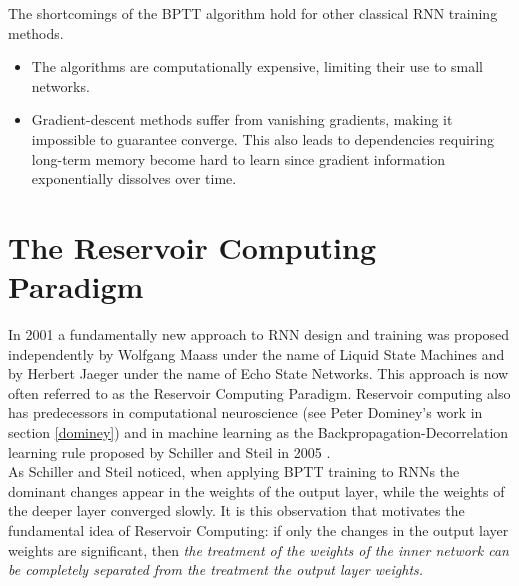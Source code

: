 \documentclass[12pt,oneside]{CUNY_CS_PhD}
\begin{document}
The shortcomings of the BPTT algorithm hold for other classical RNN training methods.
\begin{itemize}[noitemsep]
\item The algorithms are computationally expensive, limiting their use to small networks.
\item Gradient-descent methods suffer from vanishing gradients, making it impossible to guarantee converge. This also leads to dependencies requiring long-term memory become hard to learn since gradient information exponentially dissolves over time.
\end{itemize}


\chapter{The Reservoir Computing Paradigm}
In 2001 a fundamentally new approach to RNN design and training was proposed independently by Wolfgang Maass under the name of Liquid State Machines and by Herbert Jaeger under the name of Echo State Networks. This approach is now often referred to as the Reservoir Computing Paradigm. Reservoir computing also has predecessors in computational neuroscience (see Peter Dominey's work in section \ref{dominey}) and in machine learning as the Backpropagation-Decorrelation learning rule proposed by Schiller and Steil in 2005 \cite{steil2004backpropagation}.\\
As Schiller and Steil noticed, when applying BPTT training to RNNs the dominant changes appear in the weights of the output layer, while the weights of the deeper layer converged slowly. It is this observation that  motivates the fundamental idea of Reservoir Computing: if only the changes in the output layer weights are significant, then {\itshape the treatment of the weights of the inner network can be completely separated from the treatment the output layer weights.}
\end{document}

